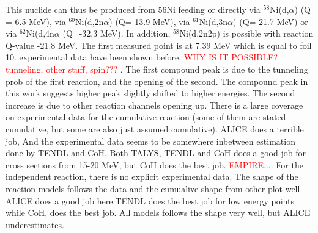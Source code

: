 \documentclass[a4paper,11pt,twoside]{book}
\begin{document}
This nuclide can thus be produced from 56Ni feeding or directly via $^{58}$Ni(d,$\alpha$) (Q = 6.5 MeV), via $^{60}$Ni(d,2n$\alpha$) (Q=-13.9 MeV), via $^{61}$Ni(d,3n$\alpha$) (Q=-21.7 MeV) or via $^{62}$Ni(d,4n$\alpha$ (Q=-32.3 MeV). In addition, $^{58}$Ni(d,2n2p) is possible with reaction Q-value -21.8 MeV. The first measured point is at 7.39 MeV which is equal to foil 10. experimental data have been shown before. \textcolor{red}{WHY IS IT POSSIBLE? tunneling, other stuff, spin??? }. The first compound peak is due to the tunneling prob of the first reaction, and the opening of the second. The compound peak in this work suggests higher peak slightly shifted to higher energies. The second increase is due to other reaction channels opening up. There is a large coverage on experimental data for the cumulative reaction \cite{Ochiai2007, Avrigeanu2016, Takacs2007, Takacs1997, Zweit1991, Usman2016, Amjed2013, Hermanne2013} (some of them are stated cumulative, but some are also just assumed cumulative). ALICE does a terrible job, And the experimental data seems to be somewhere inbetween estimation done by TENDL and CoH. Both TALYS, TENDL and CoH does a good job for cross sections from 15-20 MeV, but CoH does the best job. \textcolor{red}{EMPIRE...}. For the independent reaction, there is no explicit experimental data. The shape of the reaction models follows the data and the cumualive shape from other plot well. ALICE does a good job here.TENDL does the best job for low energy points while CoH, does the best job. All models follows the shape very well, but ALICE underestimates. 





\subsubsection{}
\end{document}
